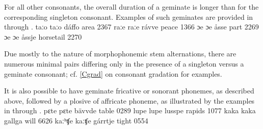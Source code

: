 For all other consonants, the overall duration of a geminate is longer than for the corresponding singleton consonant. Examples of such geminates are provided in  through .
	{taːo}	{taːo}	{dáffo}	{area\BS{}}		{2367}%
	{raːe}	{raːe}	{rávve}	{peace\BS{}}		{1366}%
	{ɔe}	{ɔe}	{åsse}	{part\BS{}}	{2269}
	{ɔe}	{ɔe}	{åssje}	{horsetail\BS{}}	{2270}

Due mostly to the nature of morphophonemic stem alternations, there are numerous minimal pairs differing only in the presence of a singleton versus a geminate consonant; cf. \SEC\ref{Cgrad} on consonant gradation for examples. %

It is also possible to have geminate fricative or sonorant phonemes, as described above, followed by a plosive of affricate phoneme, as illustrated by the examples in  through .
	{pɛte}	{pɛte}	{bävvde}	{table\BS{}}		{0289}%
	{lupe}	{lupe}	{lusspe}	{rapids\BS{}}		{1077}%
	{kaka}	{kaka}	{gallga}	{will\BS{}}		{6626}%
	{kaːʰʧe}	{kaːʧe}	{gárrtje}	{tight\BS{}}		{0554}%

